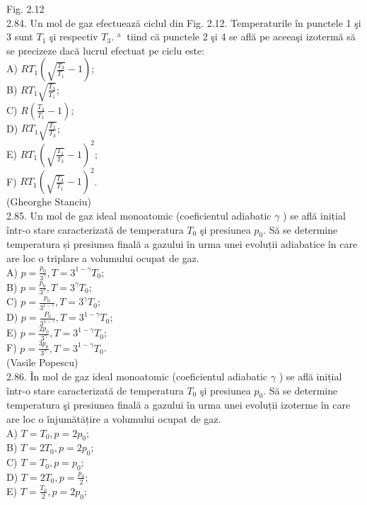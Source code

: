 \documentclass[10pt]{article}
\begin{document}
Fig. 2.12\\
2.84. Un mol de gaz efectuează ciclul din Fig. 2.12. Temperaturile în punctele 1 şi 3 sunt $T_{1}$ şi respectiv $T_{3}$. ${ }^{\text {a }}$ tiind că punctele 2 şi 4 se află pe aceeaşi izotermă să se precizeze dacă lucrul efectuat pe ciclu este:\\
A) $R T_{1}\left(\sqrt{\frac{T_{3}}{T_{1}}}-1\right)$;\\
B) $R T_{1} \sqrt{\frac{T_{3}}{T_{1}}}$;\\
C) $R\left(\frac{T_{3}}{T_{1}}-1\right)$;\\
D) $R T_{1} \sqrt{\frac{T_{1}}{T_{3}}}$;\\
E) $R T_{1}\left(\sqrt{\frac{T_{1}}{T_{3}}}-1\right)^{2}$;\\
F) $R T_{1}\left(\sqrt{\frac{T_{3}}{T_{1}}}-1\right)^{2}$.\\
(Gheorghe Stanciu)\\
2.85. Un mol de gaz ideal monoatomic (coeficientul adiabatic $\gamma$ ) se află inițial într-o stare caracterizată de temperatura $T_{0}$ şi presiunea $p_{0}$. Să se determine temperatura și presiunea finală a gazului în urma unei evoluții adiabatice în care are loc o triplare a volumului ocupat de gaz.\\
A) $p=\frac{p_{0}}{3^{\gamma}}, T=3^{1-\gamma} T_{0}$;\\
B) $p=\frac{p_{0}}{3^{\gamma}}, T=3^{\gamma} T_{0}$;\\
C) $p=\frac{p_{0}}{3^{1-\gamma}}, T=3^{\gamma} T_{0}$;\\
D) $p=\frac{P_{0}}{3^{1-\gamma}}, T=3^{1-\gamma} T_{0}$;\\
E) $p=\frac{2 p_{0}}{3^{\gamma}}, T=3^{1-\gamma} T_{0}$;\\
F) $p=\frac{3 p_{0}}{3^{\gamma}}, T=3^{1-\gamma} T_{0}$.\\
(Vasile Popescu)\\
2.86. În mol de gaz ideal monoatomic (coeficientul adiabatic $\gamma$ ) se află inițial într-o stare caracterizată de temperatura $T_{0}$ şi presiunea $p_{0}$. Să se determine temperatura şi presiunea finală a gazului în urma unei evoluții izoterme în care are loc o înjumătățire a volumului ocupat de gaz.\\
A) $T=T_{0}, p=2 p_{0}$;\\
B) $T=2 T_{0}, p=2 p_{0}$;\\
C) $T=T_{0}, p=p_{0}$;\\
D) $T=2 T_{0}, p=\frac{p_{0}}{2}$;\\
E) $T=\frac{T_{0}}{2}, p=2 p_{0}$;\\
\end{document}

